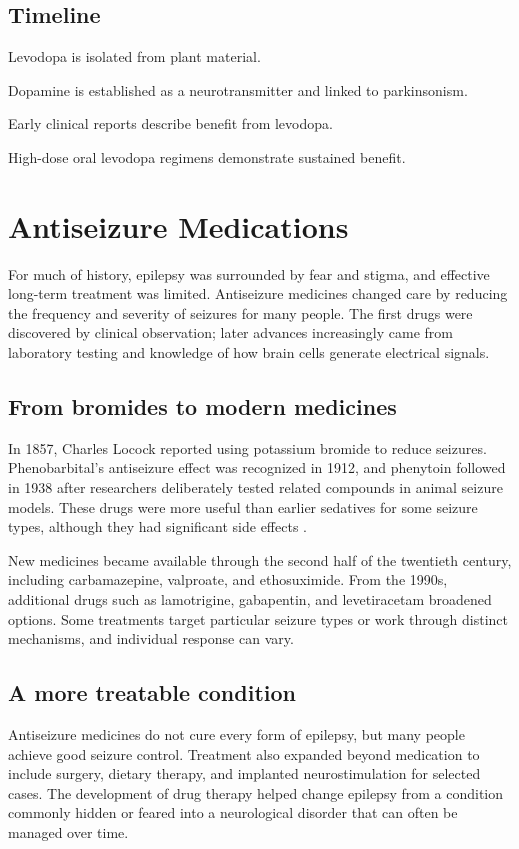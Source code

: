 \documentclass[12pt,oneside]{book}
\begin{document}
\section*{Timeline}
\begin{description}[leftmargin=2.3cm,style=nextline]
  \item[1910--1913] Levodopa is isolated from plant material.
  \item[1950s] Dopamine is established as a neurotransmitter and linked to parkinsonism.
  \item[1961] Early clinical reports describe benefit from levodopa.
  \item[1967--1969] High-dose oral levodopa regimens demonstrate sustained benefit.
\end{description}
\chapter[Antiseizure Medications]{Antiseizure Medications}

For much of history, epilepsy was surrounded by fear and stigma, and effective
long-term treatment was limited. Antiseizure medicines changed care by
reducing the frequency and severity of seizures for many people. The first
drugs were discovered by clinical observation; later advances increasingly
came from laboratory testing and knowledge of how brain cells generate
electrical signals.

\section{From bromides to modern medicines}
In 1857, Charles Locock reported using potassium bromide to reduce seizures. Phenobarbital's antiseizure effect was recognized in 1912, and phenytoin followed in 1938 after researchers deliberately tested related compounds in animal seizure models. These drugs were more useful than earlier sedatives for some seizure types, although they had significant side effects \cite{antiseizureHistory}.

New medicines became available through the second half of the twentieth
century, including carbamazepine, valproate, and ethosuximide. From the 1990s,
additional drugs such as lamotrigine, gabapentin, and levetiracetam broadened
options. Some treatments target particular seizure types or work through
distinct mechanisms, and individual response can vary.

\section{A more treatable condition}
Antiseizure medicines do not cure every form of epilepsy, but many people achieve good seizure control. Treatment also expanded beyond medication to include surgery, dietary therapy, and implanted neurostimulation for selected cases. The development of drug therapy helped change epilepsy from a condition commonly hidden or feared into a neurological disorder that can often be managed over time.
\end{document}
